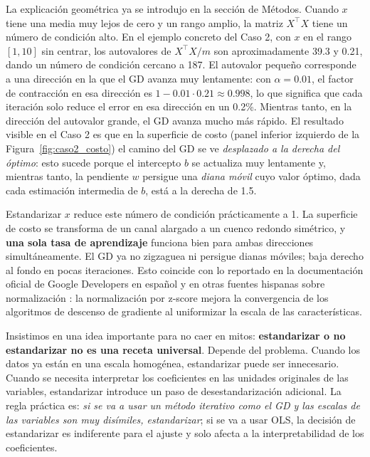 \documentclass[11pt,a4paper]{article}
\begin{document}
La explicación geométrica ya se introdujo en la sección de Métodos. Cuando $x$ tiene una media muy lejos de cero y un rango amplio, la matriz $X^{\top}X$ tiene un número de condición alto. En el ejemplo concreto del Caso 2, con $x$ en el rango $[1, 10]$ sin centrar, los autovalores de $X^{\top}X/m$ son aproximadamente 39.3 y 0.21, dando un número de condición cercano a 187. El autovalor pequeño corresponde a una dirección en la que el GD avanza muy lentamente: con $\alpha = 0.01$, el factor de contracción en esa dirección es $1 - 0.01 \cdot 0.21 \approx 0.998$, lo que significa que cada iteración solo reduce el error en esa dirección en un 0.2\%. Mientras tanto, en la dirección del autovalor grande, el GD avanza mucho más rápido. El resultado visible en el Caso 2 es que en la superficie de costo (panel inferior izquierdo de la Figura~\ref{fig:caso2_costo}) el camino del GD se ve \textit{desplazado a la derecha del óptimo}: esto sucede porque el intercepto $b$ se actualiza muy lentamente y, mientras tanto, la pendiente $w$ persigue una \textit{diana móvil} cuyo valor óptimo, dada cada estimación intermedia de $b$, está a la derecha de 1.5.

Estandarizar $x$ reduce este número de condición prácticamente a 1. La superficie de costo se transforma de un canal alargado a un cuenco redondo simétrico, y \textbf{una sola tasa de aprendizaje} funciona bien para ambas direcciones simultáneamente. El GD ya no zigzaguea ni persigue dianas móviles; baja derecho al fondo en pocas iteraciones. Esto coincide con lo reportado en la documentación oficial de Google Developers en español \cite{google_norm} y en otras fuentes hispanas sobre normalización \cite{wiki_tipificada,duque_zscore,statseasily_zscore,datacamp_norm,eitca_scaling}: la normalización por z-score mejora la convergencia de los algoritmos de descenso de gradiente al uniformizar la escala de las características.

Insistimos en una idea importante para no caer en mitos: \textbf{estandarizar o no estandarizar no es una receta universal}. Depende del problema. Cuando los datos ya están en una escala homogénea, estandarizar puede ser innecesario. Cuando se necesita interpretar los coeficientes en las unidades originales de las variables, estandarizar introduce un paso de desestandarización adicional. La regla práctica es: \textit{si se va a usar un método iterativo como el GD y las escalas de las variables son muy disímiles, estandarizar}; si se va a usar OLS, la decisión de estandarizar es indiferente para el ajuste y solo afecta a la interpretabilidad de los coeficientes.
\end{document}
